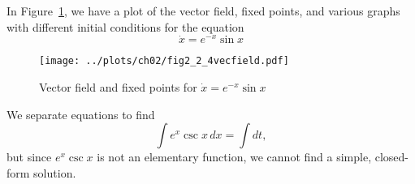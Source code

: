 
In Figure~\ref{fig2_2_4vecfield}, we have a plot of the vector field, fixed points,
and various graphs with different initial conditions for the equation 
\[
    \dot{x} = e^{-x}\sin{x}
\]
\begin{figure}[!ht]
    \texttt{[image: ../plots/ch02/fig2\_2\_4vecfield.pdf]}
    \caption{Vector field and fixed points for $\dot{x} = e^{-x}\sin{x}$
        \label{fig2_2_4vecfield}}
\end{figure}

We separate equations to find
\[
    \int e^x \csc{x} \, dx = \int dt,
\]
but since $e^x \csc{x}$ is not an elementary function, we cannot find a simple,
closed-form solution.

